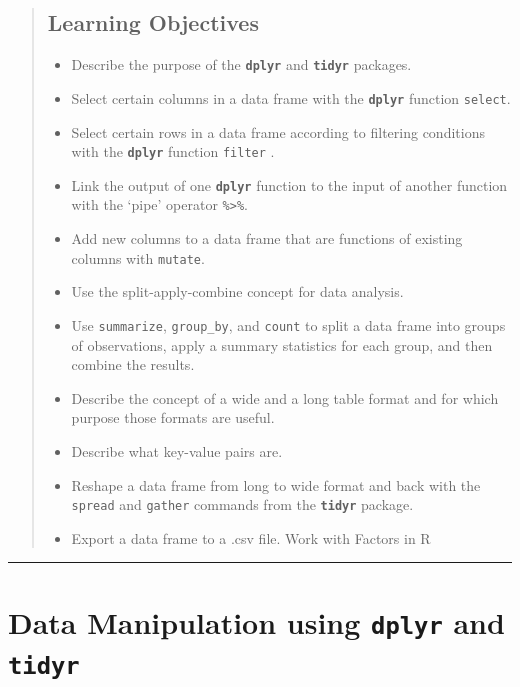 \documentclass[]{book}
\providecommand{\tightlist}{%
  \setlength{\itemsep}{0pt}\setlength{\parskip}{0pt}}
\begin{document}
\begin{quote}
\subsection{Learning Objectives}\label{learning-objectives-3}

\begin{itemize}
\tightlist
\item
  Describe the purpose of the \textbf{\texttt{dplyr}} and
  \textbf{\texttt{tidyr}} packages.
\item
  Select certain columns in a data frame with the
  \textbf{\texttt{dplyr}} function \texttt{select}.
\item
  Select certain rows in a data frame according to filtering conditions
  with the \textbf{\texttt{dplyr}} function \texttt{filter} .
\item
  Link the output of one \textbf{\texttt{dplyr}} function to the input
  of another function with the `pipe' operator
  \texttt{\%\textgreater{}\%}.
\item
  Add new columns to a data frame that are functions of existing columns
  with \texttt{mutate}.
\item
  Use the split-apply-combine concept for data analysis.
\item
  Use \texttt{summarize}, \texttt{group\_by}, and \texttt{count} to
  split a data frame into groups of observations, apply a summary
  statistics for each group, and then combine the results.
\item
  Describe the concept of a wide and a long table format and for which
  purpose those formats are useful.
\item
  Describe what key-value pairs are.
\item
  Reshape a data frame from long to wide format and back with the
  \texttt{spread} and \texttt{gather} commands from the
  \textbf{\texttt{tidyr}} package.
\item
  Export a data frame to a .csv file. Work with Factors in R
\end{itemize}
\end{quote}

\begin{center}\rule{0.5\linewidth}{\linethickness}\end{center}

\section{\texorpdfstring{Data Manipulation using \textbf{\texttt{dplyr}}
and
\textbf{\texttt{tidyr}}}{Data Manipulation using dplyr and tidyr}}\label{data-manipulation-using-dplyr-and-tidyr}
\end{document}
